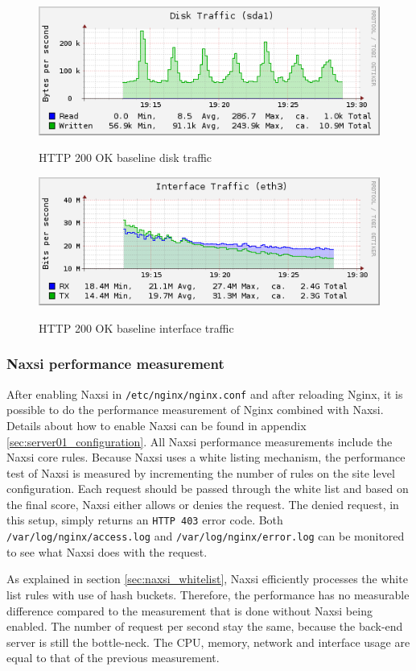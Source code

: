 \documentclass[Measurements]{subfiles}
\begin{document}
\begin{figure}[H]
\centering
\caption{HTTP 200 OK baseline disk traffic}
\includegraphics[scale=0.7]{images/results/200_with_naxsi_incremented_disallowed_parameters/disk.png}
\label{fig:Baseline Nginx disk traffic}
\end{figure}

\begin{figure}[H]
\centering
\caption{HTTP 200 OK baseline interface traffic}
\includegraphics[scale=0.7]{images/results/200_with_naxsi_incremented_disallowed_parameters/interface.png}
\label{fig:Baseline Nginx interface traffic}
\end{figure}

\subsubsection{Naxsi performance measurement}


After enabling Naxsi in \verb+/etc/nginx/nginx.conf+ and after reloading Nginx, it is possible to do the performance measurement of Nginx combined with Naxsi. Details about how to enable Naxsi can be found in appendix \ref{sec:server01_configuration}. All Naxsi performance measurements include the Naxsi core rules. Because Naxsi uses a white listing mechanism, the performance test of Naxsi is measured by incrementing the number of rules on the site level configuration. Each request should be passed through the white list and based on the final score, Naxsi either allows or denies the request. The denied request, in this setup, simply returns an \verb+HTTP 403+ error code. Both \verb+/var/log/nginx/access.log+ and \verb+/var/log/nginx/error.log+ can be monitored to see what Naxsi does with the request.

As explained in section \ref{sec:naxsi_whitelist}, Naxsi efficiently processes the white list rules with use of hash buckets. Therefore, the performance has no measurable difference compared to the measurement that is done without Naxsi being enabled. The number of request per second stay the same, because the back-end server is still the bottle-neck. The CPU, memory, network and interface usage are equal to that of the previous measurement.
\end{document}
